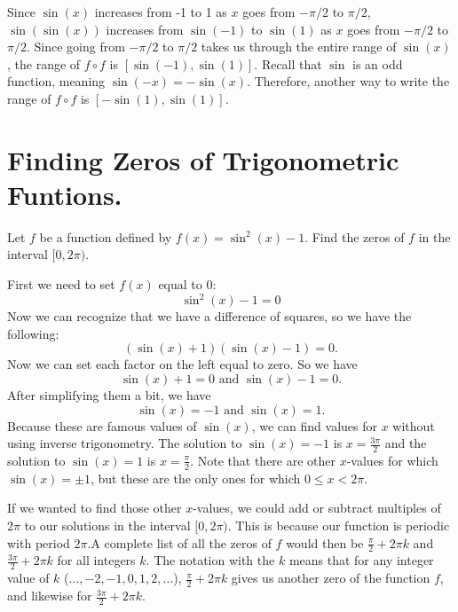 \documentclass{ximera}
\begin{document}
\begin{example}
\begin{explanation}
\begin{enumerate}
Since $\sin(x)$ increases from -1 to 1 as $x$ goes from $-\pi/2$ to $\pi/2$, $\sin(\sin(x))$ increases from $\sin(-1)$ to $\sin(1)$ as $x$ goes from $-\pi/2$ to $\pi/2$. Since going from $-\pi/2$ to $\pi/2$ takes us through the entire range of $\sin(x)$, the range of $f \circ f$ is $[\sin(-1), \sin(1)]$. Recall that $\sin$ is an odd function, meaning $\sin(-x) = -\sin(x)$. Therefore, another way to write the range of $f \circ f$ is $[-\sin(1), \sin(1)]$. 
\end{enumerate}
\end{explanation}
\end{example}

\section{Finding Zeros of Trigonometric Funtions.}
\begin{example}
Let $f$ be a function defined by $f(x)=\sin^2(x)-1$. Find the zeros of $f$ in the interval $[0, 2\pi)$.
\begin{explanation}
First we need to set $f(x)$ equal to $0$:\\
\[
\sin^2(x)-1=0
\]
Now we can recognize that we have a difference of squares, so we have the following:
\[
(\sin(x)+1)(\sin(x)-1) = 0.
\]
Now we can set each factor on the left equal to zero. So we have
\[
\sin(x)+1=0 \text{ and } \sin(x)-1 =0.
\]
After simplifying them a bit, we have
\[
\sin(x) =-1 \text{ and } \sin(x)=1.
\]
Because these are famous values of $\sin(x)$, we can find values for $x$ without using inverse trigonometry. The solution to $\sin(x) = -1$ is $x = \frac{3\pi}{2}$ and the solution to $\sin(x) = 1$ is $x = \frac{\pi}{2}$. Note that there are other $x$-values for which $\sin(x) = \pm 1$, but these are the only ones for which $0 \le x < 2\pi$. 

If we wanted to find those other $x$-values, we could add or subtract multiples of $2\pi$ to our solutions in the interval $[0, 2\pi)$. This is because our function is periodic with period $2\pi$.A complete list of all the zeros of $f$ would then be $\frac{\pi}{2} + 2\pi k$ and $\frac{3\pi}{2} + 2\pi k$ for all integers $k$. The notation with the $k$ means that for any integer value of $k$ ($\ldots, -2, -1, 0, 1, 2, \ldots$), $\frac{\pi}{2} + 2\pi k$ gives us another zero of the function $f$, and likewise for $\frac{3\pi}{2} + 2\pi k$. 
\end{explanation}
\end{example}
\end{document}
